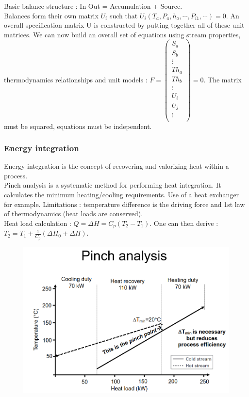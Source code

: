 \documentclass[../main.tex]{subfiles}
\begin{document}
Basic balance structure : In-Out = Accumulation + Source.\\
Balances form their own matrix $U_i$ such that $U_i (T_a,P_a, h_a, \cdots, P_{i1},\cdots)=0$. An overall specification matrix U is constructed by putting together all of these unit matrices. We can now build an overall set of equations using stream properties, thermodynamics relationships and unit models : $F = \begin{pmatrix}
    S_a\\ S_b \\ \vdots\\ Th_a\\Th_b\\ \vdots \\ U_i \\ U_j \\ \vdots \\
\end{pmatrix} = 0$. \warning The matrix must be squared, equations must be independent.\\

\subsubsection{Energy integration}
Energy integration is the concept of recovering and valorizing heat within a process.\\
Pinch analysis is a systematic method for performing heat integration. It calculates the minimum heating/cooling requirements. Use of a heat exchanger for example. Limitations : temperature difference is the driving force and 1st law of thermodynamics (heat loads are conserved).\\
Heat load calculation : $Q = \Delta H = C_p (T_2-T_1)$. One can then derive : $T_2 = T_1 + \frac{1}{C_p}(\Delta H_0 + \Delta H)$.

\begin{figure}[hbt!]
    \centering
    \includegraphics[width=0.5\linewidth]{IMAGES/ESE/Screenshot from 2025-03-25 18-00-40.png}
\end{figure}
\end{document}
